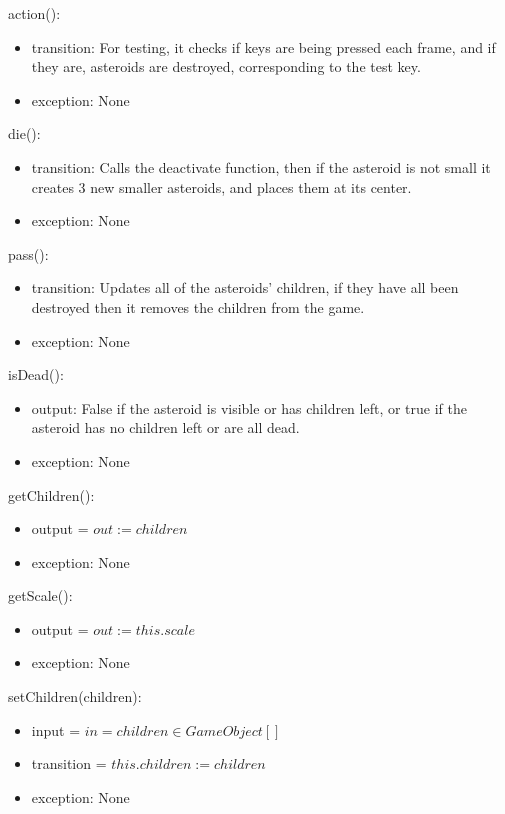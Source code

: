 \documentclass[12pt]{article}
\begin{document}
\noindent action():
\begin{itemize}
    \item transition: For testing, it checks if keys are being pressed each frame, and if they are, asteroids are destroyed, corresponding to the test key.
    \item exception: None
\end{itemize}

\noindent die():
\begin{itemize}
    \item transition: Calls the deactivate function, then if the asteroid is not small it creates 3 new smaller asteroids, and places them at its center.
    \item exception: None
\end{itemize}

\noindent pass():
\begin{itemize}
    \item transition: Updates all of the asteroids' children, if they have all been destroyed then it removes the children from the game.
    \item exception: None
\end{itemize}

\noindent isDead():
\begin{itemize}
    \item output: False if the asteroid is visible or has children left, or true if the asteroid has no children left or are all dead.
    \item exception: None
\end{itemize}

\noindent getChildren():
\begin{itemize}
    \item output = $out := children$
    \item exception: None
\end{itemize}

\noindent getScale():
\begin{itemize}
    \item output = $out := this.scale$
    \item exception: None
\end{itemize}

\noindent setChildren(children):
\begin{itemize}
    \item input = $in = children \in GameObject[]$
    \item transition = $this.children := children$
    \item exception: None
\end{itemize}
\end{document}
